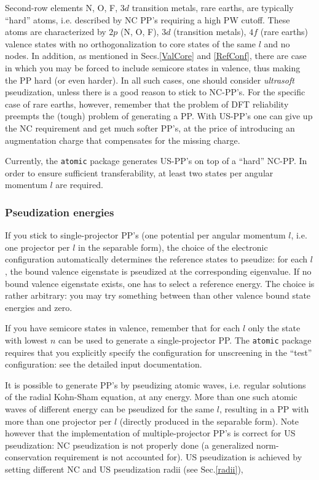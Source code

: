 \documentclass[12pt,a4paper]{article}
\begin{document}
Second-row elements N, O, F, $3d$ transition metals, rare earths, 
are typically ``hard'' atoms, i.e. described by NC PP's requiring
a high PW cutoff. These atoms are characterized by $2p$ (N, O, F), 
$3d$ (transition metals), $4f$ (rare earths) valence states with no 
orthogonalization to core states of the same $l$ and no nodes.
In addition, as mentioned in Secs.\ref{ValCore} and \ref{RefConf}, 
there are case in which you may be forced to include semicore states
in valence, thus making the PP hard (or even harder).  
In all such cases, one should consider 
{\em ultrasoft} pseudization, unless there is a good reason to stick
to NC-PP's. For the specific case of rare earths, however, remember 
that the problem of DFT reliability preempts the (tough) problem of 
generating a PP. With US-PP's one can give up the NC requirement
and get much softer PP's, at the price of introducing an augmentation 
charge that compensates for the missing charge. 

Currently, the \texttt{atomic} package generates US-PP's on top of
a ``hard'' NC-PP. In order to ensure sufficient transferability, 
at least two states per angular momentum $l$ are required. 

\subsubsection{Pseudization energies}
\label{pseudiz}
If you stick to single-projector PP's (one potential per angular momentum 
$l$, i.e. one projector per $l$ in the separable form), the choice of the 
electronic configuration automatically determines the reference states
to pseudize: for each $l$, the bound valence eigenstate is pseudized
at the corresponding eigenvalue. If no bound valence eigenstate exists,
one has to select a reference energy. The choice is rather arbitrary:
you may try something between than other valence bound state energies
and zero. 

If you have semicore states in valence, remember that for each $l$
only the state with lowest $n$ can be used to generate a single-projector
PP. The \texttt{atomic} package requires that you explicitly specify the 
configuration for unscreening in the ``test'' configuration:
see the detailed input documentation.

It is possible to generate PP's by pseudizing atomic waves,
i.e. regular solutions of the radial Kohn-Sham equation, at any
energy. More than one such atomic waves of different energy can be
pseudized for the same $l$, resulting in a PP with more than one 
projector per $l$ (directly produced in the separable form). Note
however that the implementation of multiple-projector PP's is
correct for US pseudization: NC pseudization is not properly done
(a generalized norm-conservation requirement is not accounted for).
US pseudization is achieved by
setting different NC and US pseudization radii (see Sec.\ref{radii}),
\end{document}
